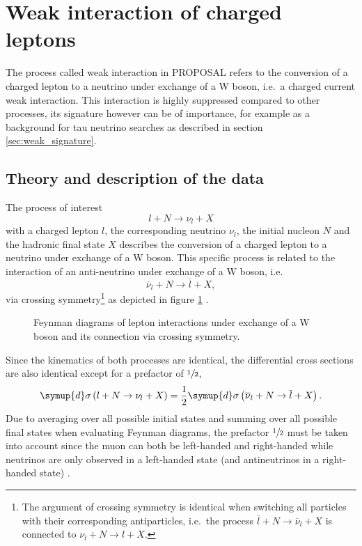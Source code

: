 \section{Weak interaction of charged leptons}

The process called weak interaction in PROPOSAL refers to the conversion of a charged lepton to a neutrino under exchange of a W boson, i.e.\ a charged current weak interaction.
This interaction is highly suppressed compared to other processes, its signature however can be of importance, for example as a background for tau neutrino searches as described in section \ref{sec:weak_signature}.

\subsection{Theory and description of the data}
\label{sec:weak_theory}

The process of interest
%
\begin{equation}
    \label{eqn:weak_lepton}
    l + N \rightarrow \nu_l + X
\end{equation}
%
with a charged lepton $l$, the corresponding neutrino $\nu_l$, the initial nucleon $N$ and the hadronic final state $X$ describes the conversion of a charged lepton to a neutrino under exchange of a W boson.
This specific process is related to the interaction of an anti-neutrino under exchange of a W boson, i.e.\
%
\begin{equation}
    \label{eqn:weak_neutrino}
    \overline{\nu}_l + N \rightarrow \overline{l} + X,
\end{equation}
%
via crossing symmetry\footnote{The argument of crossing symmetry is identical when switching all particles with their corresponding antiparticles, i.e.\ the process $\overline{l} + N \rightarrow \overline{\nu}_l + X$ is connected to $\nu_l + N \rightarrow l + X$.} as depicted in figure \ref{fig:feynman_weak} \cite{Griffiths:111880}.
%
\begin{figure}
    \centering
    
    \caption{Feynman diagrams of lepton interactions under exchange of a W boson and its connection via crossing symmetry.}
    \label{fig:feynman_weak}
\end{figure}
%
Since the kinematics of both processes are identical, the differential cross sections are also identical except for a prefactor of $\sfrac{1}{2}$,
%
\begin{equation}
    \symup{d}\sigma\left( l + N \rightarrow \nu_l + X \right) = \frac{1}{2} \symup{d}\sigma\left( \overline{\nu}_l + N \rightarrow \overline{l} + X \right).
\end{equation}
%
Due to averaging over all possible initial states and summing over all possible final states when evaluating Feynman diagrams, the prefactor $\sfrac{1}{2}$ must be taken into account since the muon can both be left-handed and right-handed while neutrinos are only observed in a left-handed state (and antineutrinos in a right-handed state) \cite{Sandrock:2018hpj}.

